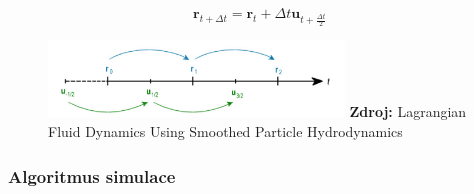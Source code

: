 \begin{equation}
	\mathbf{r}_{t + \Delta t} = \mathbf{r}_t + \Delta t \mathbf{u}_{t + \frac{\Delta t}{2}}
	\label{eq:LeapPos}
\end{equation}

\begin{figure}[hbt]
	\centering
	\captionsetup{justification=centering}
	\includegraphics[width=0.7\textwidth]{obrazky-figures/leapFrog.PNG}
	\textbf{Zdroj: } Lagrangian Fluid Dynamics Using Smoothed Particle Hydrodynamics \cite{KelagerSPH}
	\label{fig:LeapFrog}
\end{figure}

\newpage

\subsubsection{Algoritmus simulace}

